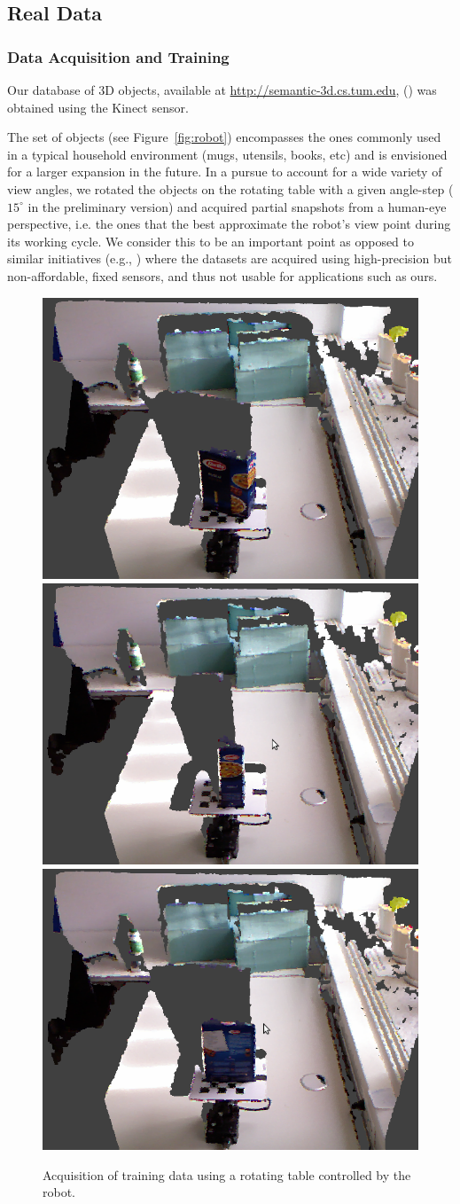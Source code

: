\documentclass[conference]{sty/IEEEtran}
\begin{document}
\subsection{Real Data}
\subsubsection{Data Acquisition and Training}

Our database of 3D objects, available at \url{http://semantic-3d.cs.tum.edu},
() was obtained using the Kinect sensor.

The set of objects (see Figure~\ref{fig:robot}) encompasses the ones commonly used
in a typical household environment (mugs, utensils, books, etc) and is envisioned for a
larger expansion in the future.  In a pursue to account for a wide variety
of view angles, we rotated the objects on the rotating table with a given
angle-step ($15^\circ$ in the preliminary version) and acquired partial
snapshots from a human-eye perspective, i.e. the ones that the best
approximate the robot's view point during its working cycle.  We consider
this to be an important point as opposed to similar initiatives (e.g.,
\cite{kit}) where the datasets are acquired using high-precision but
non-affordable, fixed sensors, and thus not usable for applications such as ours.

\begin{figure}[htb!]
  \begin{center}
    \includegraphics[width=.32\columnwidth]{figures/rot_table/barilla.png}
    \includegraphics[width=.32\columnwidth]{figures/rot_table/barilla1.png}
    \includegraphics[width=.32\columnwidth]{figures/rot_table/barilla2.png}
    \caption{Acquisition of training data using a rotating table controlled by the robot.}
    \label{fig:data_acquisition}
  \end{center}
\end{figure}
\end{document}
